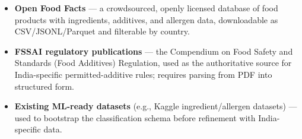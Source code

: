 \documentclass[11pt,a4paper]{article}
\begin{document}
\begin{itemize}
  \item \textbf{Open Food Facts} --- a crowdsourced, openly licensed database of food products with ingredients, additives, and allergen data, downloadable as CSV/JSONL/Parquet and filterable by country.
  \item \textbf{FSSAI regulatory publications} --- the Compendium on Food Safety and Standards (Food Additives) Regulation, used as the authoritative source for India-specific permitted-additive rules; requires parsing from PDF into structured form.
  \item \textbf{Existing ML-ready datasets} (e.g., Kaggle ingredient/allergen datasets) --- used to bootstrap the classification schema before refinement with India-specific data.
\end{itemize}



\end{document}
